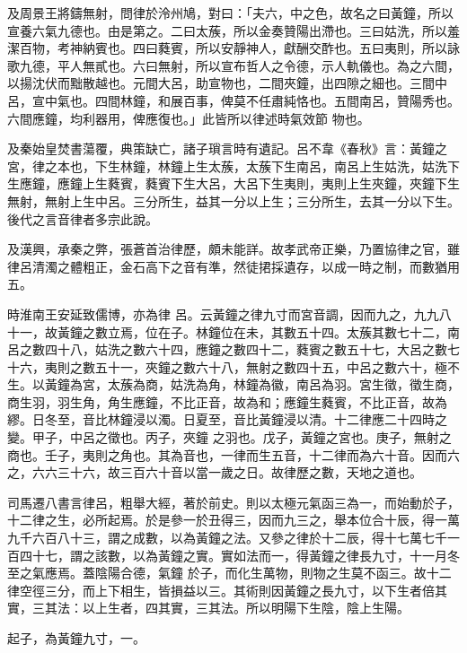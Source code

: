 \begin{pinyinscope}
 及周景王將鑄無射，問律於泠州鳩，對曰：「夫六，中之色，故名之曰黃鐘，所以宣養六氣九德也。由是第之。二曰太蔟，所以金奏贊陽出滯也。三曰姑洗，所以羞潔百物，考神納賓也。四曰蕤賓，所以安靜神人，獻酬交酢也。五曰夷則，所以詠歌九德，平人無貳也。六曰無射，所以宣布哲人之令德，示人軌儀也。為之六間，以揚沈伏而黜散越也。元間大呂，助宣物也，二間夾鐘，出四隙之細也。三間中呂，宣中氣也。四間林鐘，和展百事，俾莫不任肅純恪也。五間南呂，贊陽秀也。六間應鐘，均利器用，俾應復也。」此皆所以律述時氣效節
 物也。



 及秦始皇焚書蕩覆，典策缺亡，諸子瑣言時有遺記。呂不韋《春秋》言：黃鐘之宮，律之本也，下生林鐘，林鐘上生太蔟，太蔟下生南呂，南呂上生姑洗，姑洗下生應鐘，應鐘上生蕤賓，蕤賓下生大呂，大呂下生夷則，夷則上生夾鐘，夾鐘下生無射，無射上生中呂。三分所生，益其一分以上生；三分所生，去其一分以下生。後代之言音律者多宗此說。



 及漢興，承秦之弊，張蒼首治律歷，頗未能詳。故孝武帝正樂，乃置協律之官，雖律呂清濁之體粗正，金石高下之音有準，然徒捃採遺存，以成一時之制，而數猶用五。



 時淮南王安延致儒博，亦為律
 呂。云黃鐘之律九寸而宮音調，因而九之，九九八十一，故黃鐘之數立焉，位在子。林鐘位在未，其數五十四。太蔟其數七十二，南呂之數四十八，姑洗之數六十四，應鐘之數四十二，蕤賓之數五十七，大呂之數七十六，夷則之數五十一，夾鐘之數六十八，無射之數四十五，中呂之數六十，極不生。以黃鐘為宮，太蔟為商，姑洗為角，林鐘為徽，南呂為羽。宮生徵，徵生商，商生羽，羽生角，角生應鐘，不比正音，故為和；應鐘生蕤賓，不比正音，故為繆。日冬至，音比林鐘浸以濁。日夏至，音比黃鐘浸以清。十二律應二十四時之變。甲子，中呂之徵也。丙子，夾鐘
 之羽也。戊子，黃鐘之宮也。庚子，無射之商也。壬子，夷則之角也。其為音也，一律而生五音，十二律而為六十音。因而六之，六六三十六，故三百六十音以當一歲之日。故律歷之數，天地之道也。



 司馬遷八書言律呂，粗舉大經，著於前史。則以太極元氣函三為一，而始動於子，十二律之生，必所起焉。於是參一於丑得三，因而九三之，舉本位合十辰，得一萬九千六百八十三，謂之成數，以為黃鐘之法。又參之律於十二辰，得十七萬七千一百四十七，謂之該數，以為黃鐘之實。實如法而一，得黃鐘之律長九寸，十一月冬至之氣應焉。蓋陰陽合德，氣鐘
 於子，而化生萬物，則物之生莫不函三。故十二律空徑三分，而上下相生，皆損益以三。其術則因黃鐘之長九寸，以下生者倍其實，三其法：以上生者，四其實，三其法。所以明陽下生陰，陰上生陽。



 起子，為黃鐘九寸，一。




\end{pinyinscope}
